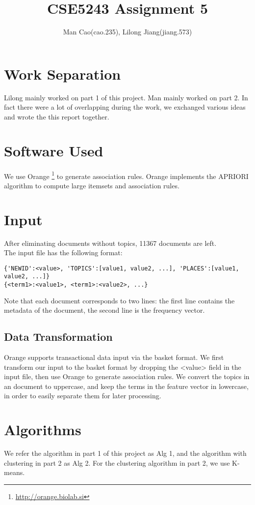 \documentclass{article}
\begin{document}
\title{CSE5243 Assignment 5}
\author{Man Cao(cao.235), Lilong Jiang(jiang.573)}
\maketitle

\section{Work Separation}
Lilong mainly worked on part 1 of this project. Man mainly worked on
part 2. In fact there were a lot of overlapping during the
work, we exchanged various ideas and wrote the this report together.

\section{Software Used}
We use Orange \footnote{\url{http://orange.biolab.si}} to generate association
rules.
Orange implements the APRIORI algorithm to compute large itemsets and association
rules.

\section{Input}
After eliminating documents without topics, 11367 documents are left.\\
The input file has the following format:
\begin{verbatim}
{'NEWID':<value>, 'TOPICS':[value1, value2, ...], 'PLACES':[value1, value2, ...]}
{<term1>:<value1>, <term1>:<value2>, ...}
\end{verbatim}
Note that each document corresponds to two lines: the first line contains the
metadata of the document, the second line is the frequency vector.

\subsection{Data Transformation}
Orange supports transactional data input via the basket format. We first
transform our input to the basket format by dropping the <value> field in
the input file, then use Orange to generate association rules.
We convert the topics in an document to uppercase, and keep the terms in
the feature vector in lowercase, in order to easily separate them for later
processing.

\section{Algorithms}
We refer the algorithm in part 1 of this project as Alg 1, and the
algorithm with clustering in part 2 as Alg 2. For the clustering algorithm in
part 2, we use K-means.
\end{document}
